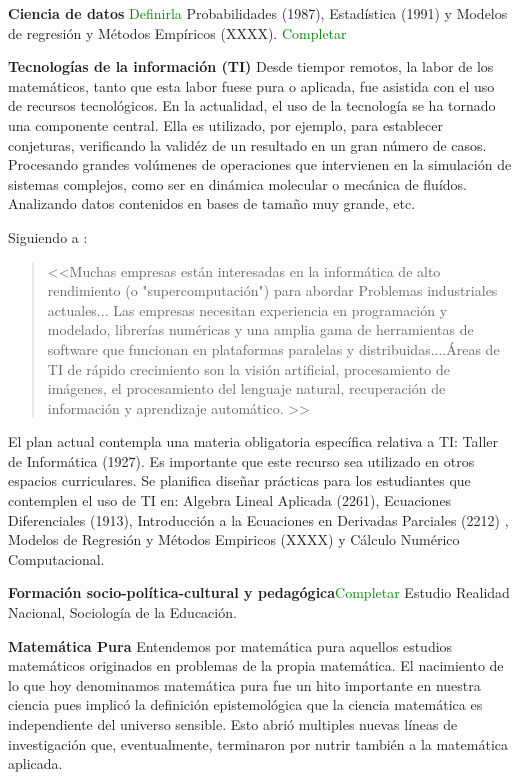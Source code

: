 \documentclass[a4paper, 12pt]{article}
\begin{document}
\begin{description}

\item{\textbf{Ciencia de datos}} \textcolor{green}{Definirla} Probabilidades (1987), Estadística (1991) y Modelos de regresión y Métodos Empíricos (XXXX). \textcolor{green}{Completar}


\item{\textbf{Tecnologías de la información (TI)}}  Desde tiempor remotos, la labor de los matemáticos, tanto que esta labor fuese pura o aplicada,  fue asistida con el uso de  recursos tecnológicos. En la actualidad, el uso de la tecnología se ha tornado una componente central. Ella es utilizado, por ejemplo, para establecer conjeturas, verificando la validéz de un resultado en un gran número de casos.  Procesando grandes volúmenes de operaciones que intervienen en la simulación de sistemas complejos, como ser en dinámica molecular o mecánica de fluídos. Analizando datos contenidos en bases de tamaño muy grande, etc. 

Siguiendo a \cite{society2012siam}: 
\begin{quote}
<<Muchas empresas están interesadas en la informática de alto rendimiento (o "supercomputación") para abordar 
Problemas industriales actuales... Las empresas necesitan experiencia en programación y modelado, librerías numéricas
 y una amplia gama de herramientas de software que funcionan en plataformas paralelas y distribuidas....Áreas de TI de rápido crecimiento son la visión artificial, procesamiento de imágenes, el procesamiento del lenguaje natural, recuperación de información y aprendizaje automático. >>
\end{quote}

El plan actual contempla una materia obligatoria específica  relativa a TI: Taller de Informática (1927). Es importante que este recurso sea utilizado en otros espacios curriculares. Se planifica diseñar prácticas para los estudiantes que contemplen el uso de TI en:  Algebra Lineal Aplicada (2261), Ecuaciones Diferenciales (1913), Introducción a la Ecuaciones en Derivadas Parciales (2212) , Modelos de Regresión y Métodos Empiricos (XXXX) y Cálculo Numérico Computacional.


\item{\textbf{Formación socio-política-cultural y pedagógica}}\textcolor{green}{Completar} Estudio Realidad Nacional, Sociología de la Educación.




\item{\textbf{Matemática Pura}} Entendemos por matemática pura aquellos estudios  matemáticos originados en problemas de la propia matemática. El nacimiento de lo que hoy denominamos  matemática pura fue un hito importante en  nuestra ciencia pues implicó la definición epistemológica que la ciencia matemática es independiente del universo sensible. Esto abrió multiples nuevas líneas de investigación que, eventualmente, terminaron por nutrir también a la matemática aplicada. 


\end{description}
\end{document}
